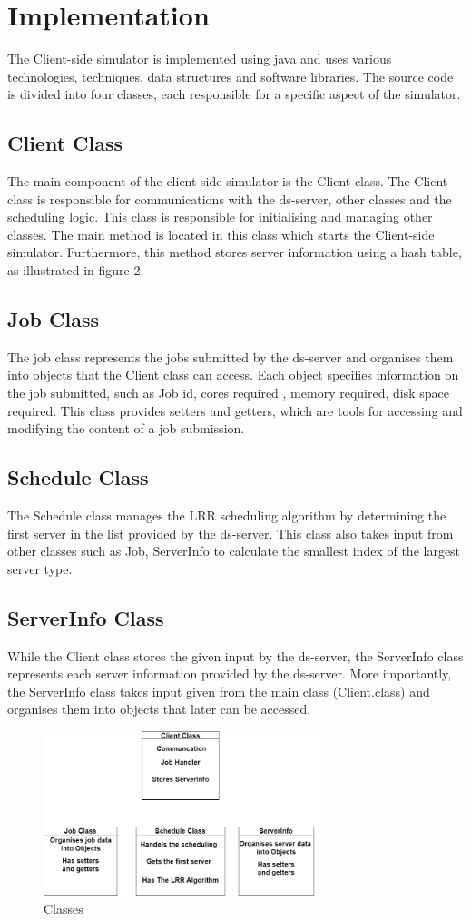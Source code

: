 \documentclass[a4paper]{article} %
\begin{document}
\section{Implementation}
The Client-side simulator is implemented using java and uses various technologies, techniques, data structures and software libraries. The source code is divided into four classes, each responsible for a specific aspect of the simulator.
\subsection{Client Class}
The main component of the client-side simulator is the Client class\cite{Mygithubrepo}. The Client class is responsible for communications with the ds-server, other classes and the scheduling logic. This class is responsible for initialising   and managing other classes. The main method is located in this class which starts the Client-side simulator. Furthermore, this method stores server information using a hash table, as illustrated in figure 2.
\subsection{Job Class}
The job class represents the jobs submitted by the ds-server and organises them into objects that the Client class can access. Each object specifies information on the job submitted, such as Job id, cores required , memory required, disk space required. This class provides setters and getters, which are tools for accessing and modifying the content of a job submission.
\subsection{Schedule Class}
The Schedule class manages the LRR scheduling algorithm by determining the first server in the list provided by the ds-server. This class also takes input from other classes such as Job, ServerInfo to calculate the smallest index of the largest server type.
\subsection{ServerInfo Class}
While the Client class stores the given input by the ds-server, the ServerInfo class represents each server information provided by the ds-server. More importantly, the ServerInfo class takes input given from the main class (Client.class) and organises them into objects that later can be accessed.
\begin{figure}[h]
    \centering
    \includegraphics[width = 80mm,scale=1]{Classes.png}
    \caption{Classes}
    \label{Classes}
\end{figure}
\end{document}
